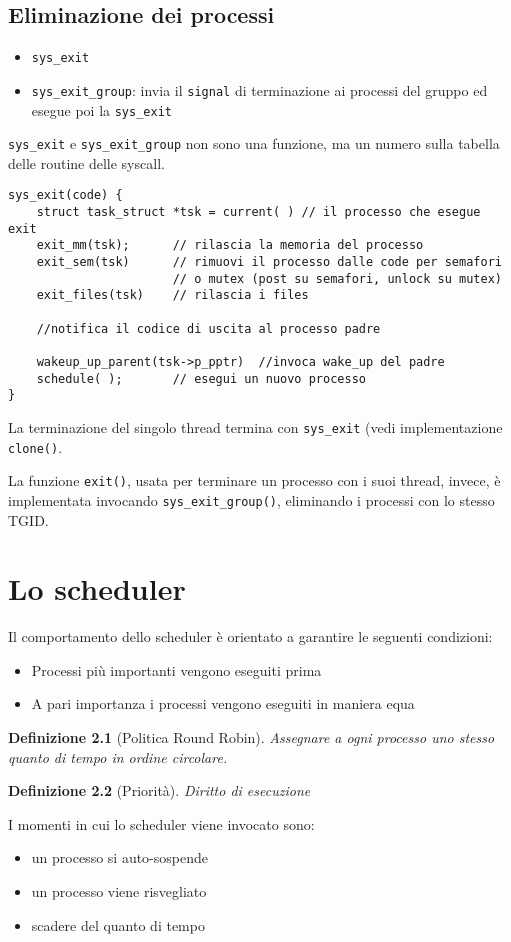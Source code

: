 \documentclass[12pt, a4paper]{report}
\newtheorem{definition}{Definizione}
\begin{document}
\section{Eliminazione dei processi}
\begin{itemize}
	\item \texttt{sys\_exit}
	\item \texttt{sys\_exit\_group}: invia il \texttt{signal} di terminazione
		ai processi del gruppo ed esegue poi la \texttt{sys\_exit}
\end{itemize}
\texttt{sys\_exit} e \texttt{sys\_exit\_group} non sono una funzione, ma un
numero sulla tabella delle routine delle syscall.
\begin{verbatim}
sys_exit(code) {
    struct task_struct *tsk = current( ) // il processo che esegue exit
    exit_mm(tsk);      // rilascia la memoria del processo
    exit_sem(tsk)      // rimuovi il processo dalle code per semafori
                       // o mutex (post su semafori, unlock su mutex)
    exit_files(tsk)    // rilascia i files

    //notifica il codice di uscita al processo padre

    wakeup_up_parent(tsk->p_pptr)  //invoca wake_up del padre
    schedule( );       // esegui un nuovo processo
}
\end{verbatim}
La terminazione del singolo thread termina con \texttt{sys\_exit} (vedi
implementazione \texttt{clone()}.

La funzione \texttt{exit()}, usata per terminare un processo con i suoi thread,
invece, è implementata invocando \texttt{sys\_exit\_group()}, eliminando i
processi con lo stesso TGID.

\chapter{Lo scheduler}
Il comportamento dello scheduler è orientato a garantire le seguenti
condizioni:
\begin{itemize}
	\item Processi più importanti vengono eseguiti prima
	\item A pari importanza i processi vengono eseguiti in maniera equa
\end{itemize}
\begin{definition}[Politica Round Robin]
	Assegnare a ogni processo uno stesso quanto di tempo in ordine circolare.
\end{definition}
\begin{definition}[Priorità]
	Diritto di esecuzione
\end{definition}
I momenti in cui lo scheduler viene invocato sono:
\begin{itemize}
	\item un processo si auto-sospende
	\item un processo viene risvegliato
	\item scadere del quanto di tempo
\end{itemize}
\end{document}
